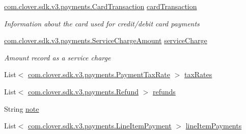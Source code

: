 \begin{DoxyCompactItemize}
\item 
\hyperlink{classcom_1_1clover_1_1sdk_1_1v3_1_1payments_1_1_card_transaction}{com.\+clover.\+sdk.\+v3.\+payments.\+Card\+Transaction} \hyperlink{classcom_1_1clover_1_1sdk_1_1v3_1_1payments_1_1_payment_a31305742a90feeadee5ed273822f8cd6}{card\+Transaction}
\begin{DoxyCompactList}\small\item\em Information about the card used for credit/debit card payments \end{DoxyCompactList}\item 
\hyperlink{classcom_1_1clover_1_1sdk_1_1v3_1_1payments_1_1_service_charge_amount}{com.\+clover.\+sdk.\+v3.\+payments.\+Service\+Charge\+Amount} \hyperlink{classcom_1_1clover_1_1sdk_1_1v3_1_1payments_1_1_payment_ab6703c1a25417778ce48675f3d8b0806}{service\+Charge}
\begin{DoxyCompactList}\small\item\em Amount record as a service charge \end{DoxyCompactList}\item 
List$<$ \hyperlink{classcom_1_1clover_1_1sdk_1_1v3_1_1payments_1_1_payment_tax_rate}{com.\+clover.\+sdk.\+v3.\+payments.\+Payment\+Tax\+Rate} $>$ \hyperlink{classcom_1_1clover_1_1sdk_1_1v3_1_1payments_1_1_payment_ad0434f3d49e81b763ac429c12e388d61}{tax\+Rates}
\item 
List$<$ \hyperlink{classcom_1_1clover_1_1sdk_1_1v3_1_1payments_1_1_refund}{com.\+clover.\+sdk.\+v3.\+payments.\+Refund} $>$ \hyperlink{classcom_1_1clover_1_1sdk_1_1v3_1_1payments_1_1_payment_aa50b9a6d0dc9e7e9b3aa990a95e0f934}{refunds}
\item 
String \hyperlink{classcom_1_1clover_1_1sdk_1_1v3_1_1payments_1_1_payment_a7c2ec32ed514f03ac272e7b29e5c36fb}{note}
\item 
List$<$ \hyperlink{classcom_1_1clover_1_1sdk_1_1v3_1_1payments_1_1_line_item_payment}{com.\+clover.\+sdk.\+v3.\+payments.\+Line\+Item\+Payment} $>$ \hyperlink{classcom_1_1clover_1_1sdk_1_1v3_1_1payments_1_1_payment_a576d3b704d1e6a5cb5f222beda590c24}{line\+Item\+Payments}

\end{DoxyCompactItemize}
